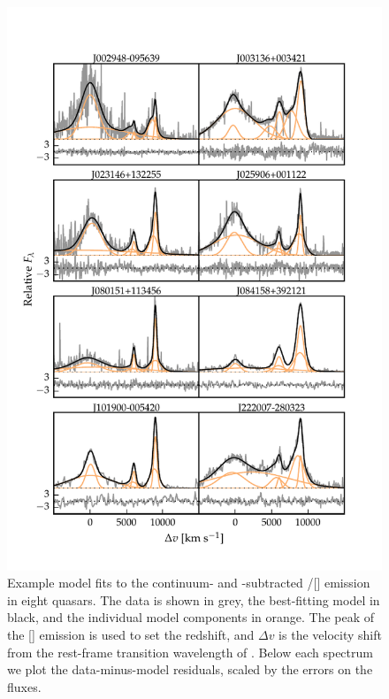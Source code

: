 \begin{figure}
    \centering
    \includegraphics[width=\textwidth]{figures/chapter04/example_spectrum_grid.pdf} 
    \caption[{Example model fits to the \hbns/[] emission in eight quasars.}]{Example model fits to the continuum- and -subtracted \hbns/[] emission in eight quasars. The data is shown in grey, the best-fitting model in black, and the individual model components in orange. The peak of the [] emission is used to set the redshift, and $\Delta{v}$ is the velocity shift from the rest-frame transition wavelength of \hbns. Below each spectrum we plot the data-minus-model residuals, scaled by the errors on the fluxes.}     
    \label{fig:example_spectrum_grid}
\end{figure}


